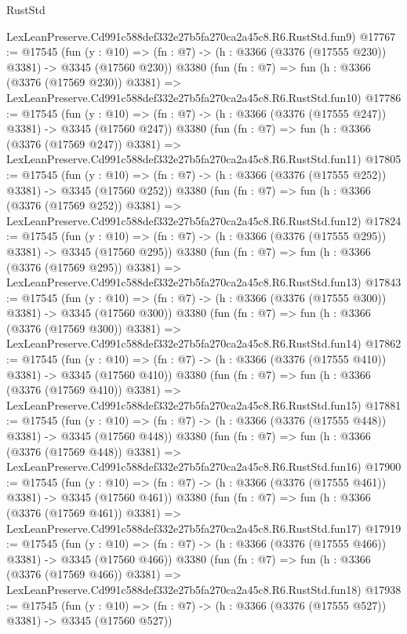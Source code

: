 \begin{lexlean}{RustStd}
\begin{coremodule}
    LexLeanPreserve.Cd991c588def332e27b5fa270ca2a45c8.R6.RustStd.fun9)
@17767 := @17545
    (fun (y : @10) => (fn : @7) -> (h : @3366 (@3376 (@17555 @230)) @3381) -> @3345 (@17560 @230))
    @3380
    (fun (fn : @7) =>
    fun (h : @3366 (@3376 (@17569 @230)) @3381) =>
    LexLeanPreserve.Cd991c588def332e27b5fa270ca2a45c8.R6.RustStd.fun10)
@17786 := @17545
    (fun (y : @10) => (fn : @7) -> (h : @3366 (@3376 (@17555 @247)) @3381) -> @3345 (@17560 @247))
    @3380
    (fun (fn : @7) =>
    fun (h : @3366 (@3376 (@17569 @247)) @3381) =>
    LexLeanPreserve.Cd991c588def332e27b5fa270ca2a45c8.R6.RustStd.fun11)
@17805 := @17545
    (fun (y : @10) => (fn : @7) -> (h : @3366 (@3376 (@17555 @252)) @3381) -> @3345 (@17560 @252))
    @3380
    (fun (fn : @7) =>
    fun (h : @3366 (@3376 (@17569 @252)) @3381) =>
    LexLeanPreserve.Cd991c588def332e27b5fa270ca2a45c8.R6.RustStd.fun12)
@17824 := @17545
    (fun (y : @10) => (fn : @7) -> (h : @3366 (@3376 (@17555 @295)) @3381) -> @3345 (@17560 @295))
    @3380
    (fun (fn : @7) =>
    fun (h : @3366 (@3376 (@17569 @295)) @3381) =>
    LexLeanPreserve.Cd991c588def332e27b5fa270ca2a45c8.R6.RustStd.fun13)
@17843 := @17545
    (fun (y : @10) => (fn : @7) -> (h : @3366 (@3376 (@17555 @300)) @3381) -> @3345 (@17560 @300))
    @3380
    (fun (fn : @7) =>
    fun (h : @3366 (@3376 (@17569 @300)) @3381) =>
    LexLeanPreserve.Cd991c588def332e27b5fa270ca2a45c8.R6.RustStd.fun14)
@17862 := @17545
    (fun (y : @10) => (fn : @7) -> (h : @3366 (@3376 (@17555 @410)) @3381) -> @3345 (@17560 @410))
    @3380
    (fun (fn : @7) =>
    fun (h : @3366 (@3376 (@17569 @410)) @3381) =>
    LexLeanPreserve.Cd991c588def332e27b5fa270ca2a45c8.R6.RustStd.fun15)
@17881 := @17545
    (fun (y : @10) => (fn : @7) -> (h : @3366 (@3376 (@17555 @448)) @3381) -> @3345 (@17560 @448))
    @3380
    (fun (fn : @7) =>
    fun (h : @3366 (@3376 (@17569 @448)) @3381) =>
    LexLeanPreserve.Cd991c588def332e27b5fa270ca2a45c8.R6.RustStd.fun16)
@17900 := @17545
    (fun (y : @10) => (fn : @7) -> (h : @3366 (@3376 (@17555 @461)) @3381) -> @3345 (@17560 @461))
    @3380
    (fun (fn : @7) =>
    fun (h : @3366 (@3376 (@17569 @461)) @3381) =>
    LexLeanPreserve.Cd991c588def332e27b5fa270ca2a45c8.R6.RustStd.fun17)
@17919 := @17545
    (fun (y : @10) => (fn : @7) -> (h : @3366 (@3376 (@17555 @466)) @3381) -> @3345 (@17560 @466))
    @3380
    (fun (fn : @7) =>
    fun (h : @3366 (@3376 (@17569 @466)) @3381) =>
    LexLeanPreserve.Cd991c588def332e27b5fa270ca2a45c8.R6.RustStd.fun18)
@17938 := @17545
    (fun (y : @10) => (fn : @7) -> (h : @3366 (@3376 (@17555 @527)) @3381) -> @3345 (@17560 @527))

\end{coremodule}
\end{lexlean}
